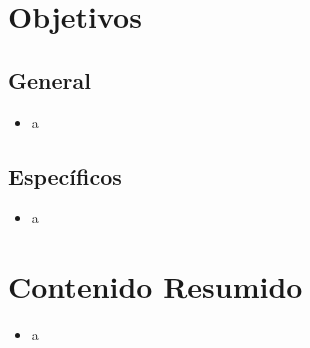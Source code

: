 \documentclass[11pt]{article}
\begin{document}
\section*{Objetivos}

\subsection*{General}

\begin{itemize}
\item a 
\end{itemize}

\subsection*{Específicos}

\begin{itemize}
\item a 
\end{itemize}

\section*{Contenido Resumido}

\begin{itemize}
\item a 
\end{itemize}

\end{document}
